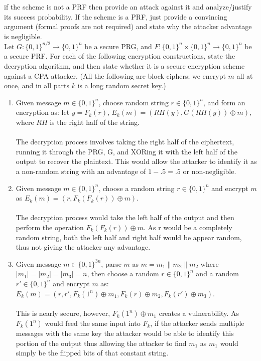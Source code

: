 \documentclass[12pt]{article}
\newcommand{\zo}{\{0,1\}}
\newcommand*\concat{\mathbin{\|}}
\begin{document}
 if the scheme is not a PRF then provide an attack against it and analyze/justify its success probability. If the scheme is a PRF, just provide a convincing argument (formal proofs are not required) and state why the attacker advantage is negligible. \\

Let $G:\zo^{n/2} \to \zo^{n}$ be a secure PRG, and $F:\zo^n \times \zo^n \to \zo^n$ be a secure PRF. For each of the following encryption constructions, state the decryption algorithm, and then state whether it is a secure encryption scheme against a CPA attacker.  (All the following are block ciphers; we encrypt $m$ all at once, and in all parts $k$ is a long random secret key.)
\begin{enumerate}
\item Given message $m \in \zo^{n}$, choose random string $r \in \zo^{n}$, and form an encryption as: let $y = F_k(r)$, $E_k(m) = (RH(y), G(RH(y))\oplus m)$, where $RH$ is the right half of the string. 
\\\\The decryption process involves taking the right half of the ciphertext, running it through the PRG, G, and
XORing it with the left half of the output to recover the plaintext. This would allow the attacker to identify
it as a non-random string with an advantage of $1 - .5 = .5$ or non-negligible.
\item Given message $m \in \zo^{n}$, choose a random string $r\in \zo^{n}$ and encrypt $m$ as $E_k(m) = (r, F_k(F_k(r))\oplus m)$.
\\\\The decryption process would take the left half of the output and then perform the operation $F_k(F_k(r))\oplus m$. As 
r would be a completely random string, both the left half and right half
would be appear random, thus not giving the attacker any advantage. 
\item Given message $m \in \zo^{3n}$, parse $m$ as $m = m_1 \concat m_2 \concat m_2$ where $|m_1| = |m_2| = |m_3| = n$, then choose a random $r \in \zo^{n}$ and a random $r' \in \zo^{n}$ and encrypt $m$ as:\\
$E_k(m) = (r, r', F_k(1^n) \oplus m_1, F_k(r)\oplus m_2, F_k(r') \oplus m_3)$.
\\\\This is nearly secure, however, $F_k(1^n) \oplus m_1$ creates a vulnerability. 
As $F_k(1^n)$ would feed the same input into $F_k$, if the attacker sends multiple
messages with the same key the attacker would be able to identify this portion of the output
thus allowing the attacker to find $m_1$ as $m_1$ would simply be the flipped bits
of that constant string.
\end{enumerate} 
\end{document}
